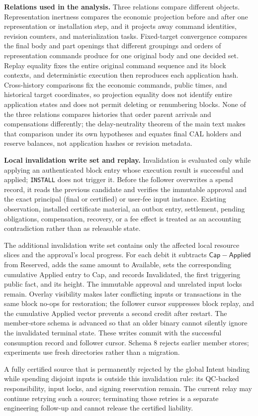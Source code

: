 \noindent\textbf{Relations used in the analysis.}
Three relations compare different objects. Representation inertness compares the economic projection before and after one representation or installation step, and it projects away command identities, revision counters, and materialization tasks. Fixed-target convergence compares the final body and part openings that different groupings and orders of representation commands produce for one original body and one decided set. Replay equality fixes the entire original command sequence and its block contexts, and deterministic execution then reproduces each application hash. Cross-history comparisons fix the economic commands, public times, and historical target coordinates, so projection equality does not identify entire application states and does not permit deleting or renumbering blocks. None of the three relations compares histories that order parent arrivals and compensations differently; the delay-neutrality theorem of the main text makes that comparison under its own hypotheses and equates final CAL holders and reserve balances, not application hashes or revision metadata.

\noindent\textbf{Local invalidation write set and replay.}
Invalidation is evaluated only while applying an authenticated block
entry whose execution result is successful and applied; \texttt{INSTALL}
does not trigger it.  Before the follower overwrites a spend record, it
reads the previous candidate and verifies the immutable approval and
the exact principal (final or certified) or user-fee input instance.  Existing observation,
installed certificate material, an outbox entry, settlement, pending
obligations, compensation, recovery, or a fee effect is treated as an
accounting contradiction rather than as releasable state.

The additional invalidation write set contains only the affected local resource slices
and the approval's local progress.  For each debit it subtracts
$\mathsf{Cap}-\mathsf{Applied}$ from Reserved, adds the same amount to
Available, sets the corresponding cumulative Applied entry to Cap,
and records Invalidated, the first triggering public fact, and its
height.  The immutable approval and unrelated input locks remain.
Overlay visibility makes later conflicting inputs or transactions in
the same block no-ops for restoration; the follower cursor suppresses
block replay, and the cumulative Applied vector prevents a second
credit after restart.  The member-store schema is advanced so that an
older binary cannot silently ignore the invalidated terminal state. These writes commit with the successful consumption record and follower cursor. Schema 8 rejects earlier member stores; experiments use fresh directories rather than a migration.

A fully certified source that is permanently rejected by the global
Intent binding while spending disjoint inputs is outside this
invalidation rule: its QC-backed responsibility, input locks, and
signing reservation remain.  The current relay may continue retrying
such a source; terminating those retries is a separate engineering
follow-up and cannot release the certified liability.
